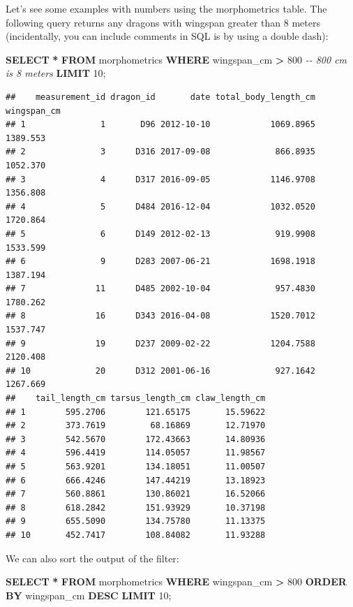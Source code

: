 \documentclass[
]{book}
\newenvironment{Shaded}{\begin{snugshade}}{\end{snugshade}}
\newcommand{\CommentTok}[1]{\textcolor[rgb]{0.56,0.35,0.01}{\textit{#1}}}
\newcommand{\DecValTok}[1]{\textcolor[rgb]{0.00,0.00,0.81}{#1}}
\newcommand{\KeywordTok}[1]{\textcolor[rgb]{0.13,0.29,0.53}{\textbf{#1}}}
\newcommand{\NormalTok}[1]{#1}
\newcommand{\OperatorTok}[1]{\textcolor[rgb]{0.81,0.36,0.00}{\textbf{#1}}}
\begin{document}
Let's see some examples with numbers using the morphometrics table. The
following query returns any dragons with wingspan greater than 8 meters
(incidentally, you can include comments in SQL is by using a double dash):

\begin{Shaded}
\begin{Highlighting}[]
\KeywordTok{SELECT} \OperatorTok{*} 
\KeywordTok{FROM}\NormalTok{ morphometrics}
\KeywordTok{WHERE}\NormalTok{ wingspan\_cm }\OperatorTok{\textgreater{}} \DecValTok{800} \CommentTok{{-}{-} 800 cm is 8 meters}
\KeywordTok{LIMIT} \DecValTok{10}\NormalTok{;}
\end{Highlighting}
\end{Shaded}

\begin{verbatim}
##    measurement_id dragon_id       date total_body_length_cm wingspan_cm
## 1               1       D96 2012-10-10            1069.8965    1389.553
## 2               3      D316 2017-09-08             866.8935    1052.370
## 3               4      D317 2016-09-05            1146.9708    1356.808
## 4               5      D484 2016-12-04            1032.0520    1720.864
## 5               6      D149 2012-02-13             919.9908    1533.599
## 6               9      D283 2007-06-21            1698.1918    1387.194
## 7              11      D485 2002-10-04             957.4830    1780.262
## 8              16      D343 2016-04-08            1520.7012    1537.747
## 9              19      D237 2009-02-22            1204.7588    2120.408
## 10             20      D312 2001-06-16             927.1642    1267.669
##    tail_length_cm tarsus_length_cm claw_length_cm
## 1        595.2706        121.65175       15.59622
## 2        373.7619         68.16869       12.71970
## 3        542.5670        172.43663       14.80936
## 4        596.4419        114.05057       11.98567
## 5        563.9201        134.18051       11.00507
## 6        666.4246        147.44219       13.18923
## 7        560.8861        130.86021       16.52066
## 8        618.2842        151.93929       10.37198
## 9        655.5090        134.75780       11.13375
## 10       452.7417        108.84082       11.93288
\end{verbatim}

We can also sort the output of the filter:

\begin{Shaded}
\begin{Highlighting}[]
\KeywordTok{SELECT} \OperatorTok{*} 
\KeywordTok{FROM}\NormalTok{ morphometrics}
\KeywordTok{WHERE}\NormalTok{ wingspan\_cm }\OperatorTok{\textgreater{}} \DecValTok{800} 
\KeywordTok{ORDER} \KeywordTok{BY}\NormalTok{ wingspan\_cm }\KeywordTok{DESC}
\KeywordTok{LIMIT} \DecValTok{10}\NormalTok{;}
\end{Highlighting}
\end{Shaded}
\end{document}
